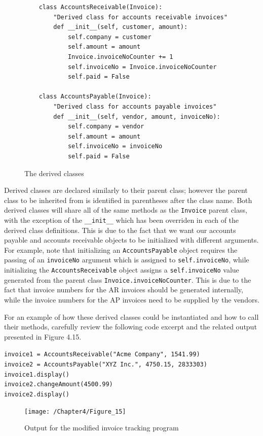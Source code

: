 \documentclass{book}
\begin{document}
\begin{figure}[h]
	\caption{The derived classes}
	\begin{lstlisting}
	class AccountsReceivable(Invoice):
		"Derived class for accounts receivable invoices"
		def __init__(self, customer, amount):
			self.company = customer
			self.amount = amount
			Invoice.invoiceNoCounter += 1
			self.invoiceNo = Invoice.invoiceNoCounter
			self.paid = False
	
	class AccountsPayable(Invoice):
		"Derived class for accounts payable invoices"
		def __init__(self, vendor, amount, invoiceNo):
			self.company = vendor
			self.amount = amount
			self.invoiceNo = invoiceNo
			self.paid = False
	\end{lstlisting}
\end{figure}

Derived classes are declared similarly to their parent class; however the parent class to be inherited from is identified in parentheses after the class name. Both derived classes will share all of the same methods as the \texttt{Invoice} parent class, with the exception of the \texttt{\_\_init\_\_} which has been overriden in each of the derived class definitions. This is due to the fact that we want our accounts payable and accounts receivable objects to be initialized with different arguments. For example, note that initializing an \texttt{AccountsPayable} object requires the passing of an \texttt{invoiceNo} argument which is assigned to \texttt{self.invoiceNo}, while initializing the \texttt{AccountsReceivable} object assigns a \texttt{self.invoiceNo} value generated from the parent class \texttt{Invoice.invoiceNoCounter}. This is due to the fact that invoice numbers for the AR invoices should be generated internally, while the invoice numbers for the AP invoices need to be supplied by the vendors.

For an example of how these derived classes could be instantiated and how to call their methods, carefully review the following code excerpt and the related output presented in Figure 4.15. 

\texttt{invoice1 = AccountsReceivable("Acme Company", 1541.99) \\
invoice2 = AccountsPayable("XYZ Inc.", 4750.15, 2833303) \\
invoice1.display() \\
invoice2.changeAmount(4500.99) \\
invoice2.display()} 

\begin{figure}[h]
	\caption{Output for the modified invoice tracking program}
	\centering\texttt{[image: /Chapter4/Figure\_15]}
\end{figure}
\end{document}
